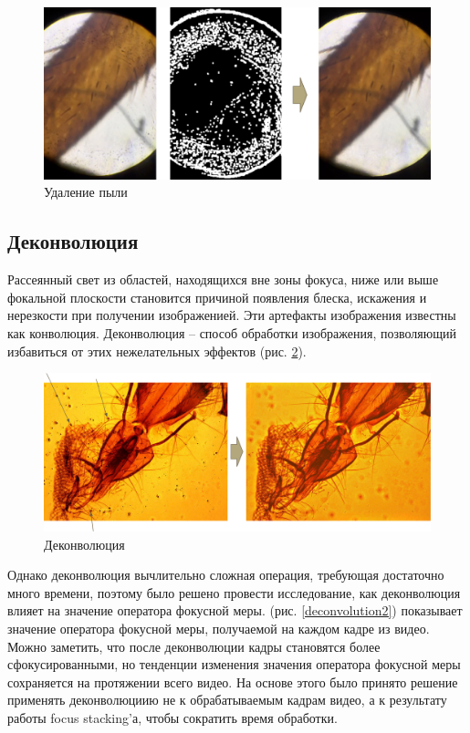 \documentclass[14pt]{matmex-diploma-custom}
\begin{document}
\newpage

\begin{figure}[h]
\centering
\includegraphics[width=1.0\textwidth]{figures/dust2.png}
\caption{Удаление пыли}
\label{dust_filtering1}
\end{figure}


\subsection{Деконволюция}
Рассеянный свет из областей, находящихся вне зоны фокуса, ниже или выше фокальной плоскости становится причиной появления блеска, искажения и нерезкости при получении изображенией. Эти артефакты изображения известны как конволюция. Деконволюция – способ обработки изображения, позволяющий избавиться от этих нежелательных эффектов (рис. \ref{deconvolution1}).

\begin{figure}[h]
\centering
\includegraphics[width=1.0\textwidth]{figures/deconvolution1.png}
\caption{Деконволюция}
\label{deconvolution1}
\end{figure}

\newpage

Однако деконволюция вычлительно сложная операция, требующая достаточно много времени, поэтому было решено провести исследование, как деконволюция влияет на значение оператора фокусной меры. (рис. \ref{deconvolution2}) показывает значение оператора фокусной меры, получаемой на каждом кадре из видео. Можно заметить, что после деконволюции кадры становятся более сфокусированными, но тенденции изменения значения оператора фокусной меры сохраняется на протяжении всего видео. На основе этого было принято решение применять деконволюциию не к обрабатываемым кадрам видео, а к результату работы focus stacking'а, чтобы сократить время обработки.
\end{document}
